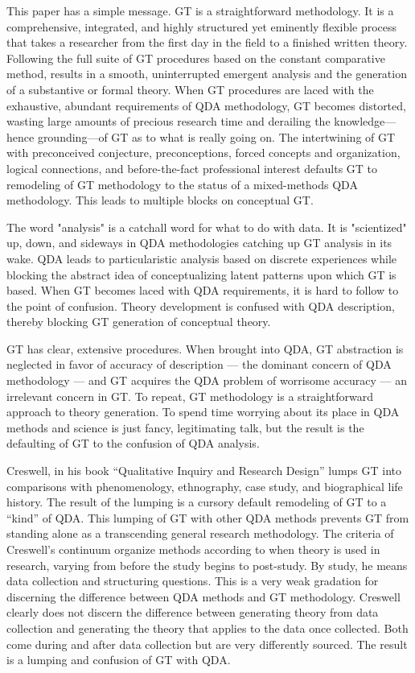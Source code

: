This paper has a simple message. GT is a straightforward methodology. It is a comprehensive, integrated, and highly structured yet eminently flexible process that takes a researcher from the first day in the field to a finished written theory.
Following the full suite of GT procedures based on the constant comparative method, results in a smooth, uninterrupted emergent analysis and the generation of a substantive or formal theory.
When GT procedures are laced with the exhaustive, abundant requirements of QDA methodology, GT becomes distorted, wasting large amounts of precious research time and derailing the knowledge—hence grounding—of GT as to what is really going on. 
The intertwining of GT with preconceived conjecture, preconceptions, forced concepts and organization, logical connections, and before-the-fact professional interest defaults GT to remodeling of GT methodology to the status of a mixed-methods QDA methodology. 
This leads to multiple blocks on conceptual GT.

The word "analysis" is a catchall word for what to do with data.
It is "scientized" up, down, and sideways in QDA methodologies catching up GT analysis in its
wake.
QDA leads to particularistic analysis based on discrete experiences while
blocking the abstract idea of conceptualizing latent patterns upon which GT is
based.
When GT becomes laced with QDA requirements, it is hard to follow to
the point of confusion.
Theory development is confused with QDA description, thereby blocking GT generation of conceptual theory.

GT has clear, extensive procedures.
When brought into QDA, GT abstraction is neglected in favor of accuracy of description
--- the dominant concern of QDA methodology --- 
and GT acquires the QDA problem of worrisome accuracy
---
an irrelevant concern in GT.
To repeat, GT methodology is a straightforward approach to theory generation.
To spend time worrying about its place in QDA methods and science is just fancy, legitimating talk, but the result is the defaulting of GT to the confusion of QDA analysis.

Creswell, in his book “Qualitative Inquiry and Research Design”
\citep{book.creswell98}
lumps GT into comparisons with phenomenology, ethnography, case study, and biographical life history. 
The result of the lumping is a cursory default remodeling of GT to a “kind” of QDA. 
This lumping of GT with other QDA methods prevents GT from standing alone as a transcending general research methodology.
The criteria of Creswell’s continuum organize methods according to when theory is used in research, varying from before the study begins to post-study. 
By study, he means data collection and structuring questions. This is a very weak gradation for discerning the difference between QDA methods and GT methodology. 
Creswell clearly does not discern the difference between generating theory from data collection and generating the theory that applies to the
data once collected. 
Both come during and after data collection but are very differently sourced.
The result is a lumping and confusion of GT with QDA.

